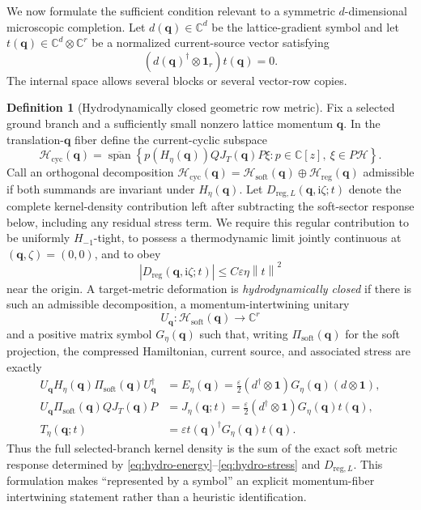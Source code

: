 \documentclass[11pt]{article}
\theoremstyle{definition}
\newtheorem{definition}[theorem]{Definition}
\theoremstyle{remark}
\newcommand{\cH}{\mathcal H}
\newcommand{\Id}{\mathbf 1}
\newcommand{\Span}{\operatorname{span}}
\newcommand{\I}{\mathrm i}
\newcommand{\norm}[1]{\left\lVert #1\right\rVert}
\newcommand{\abs}[1]{\left\lvert #1\right\rvert}
\newcommand{\eps}{\varepsilon}
\newcommand{\bq}{\bm q}
\begin{document}
We now formulate the sufficient condition relevant to a symmetric
$d$-dimensional microscopic completion.  Let $d(\bq)\in\mathbb C^d$ be the
lattice-gradient symbol and let $t(\bq)\in\mathbb C^d\otimes\mathbb C^r$ be a
normalized current-source vector satisfying
\begin{equation}
 (d(\bq)^\dagger\otimes\Id_r)t(\bq)=0.
 \label{eq:transverse-symbol}
\end{equation}
The internal space allows several blocks or several vector-row copies.

\begin{definition}[Hydrodynamically closed geometric row metric]
\label{def:hydro-closed}
Fix a selected ground branch and a sufficiently small nonzero lattice momentum
$\bq$.  In the translation-$\bq$ fiber define the current-cyclic subspace
\begin{equation}
 \cH_{\mathrm{cyc}}(\bq)
 =\overline{\Span}\left\{
 p(H_\eta(\bq))QJ_T(\bq)P\xi:
 p\in\mathbb C[z],\ \xi\in P\cH
 \right\}.
 \label{eq:current-cyclic}
\end{equation}
Call an orthogonal decomposition
$\cH_{\mathrm{cyc}}(\bq)=\cH_{\mathrm{soft}}(\bq)\oplus
\cH_{\mathrm{reg}}(\bq)$ admissible if both summands are invariant under
$H_\eta(\bq)$.  Let $D_{\mathrm{reg},L}(\bq,\I\zeta;t)$ denote the complete
kernel-density contribution left after subtracting the soft-sector response
below, including any residual stress term.  We require this regular contribution
to be uniformly $H_{-1}$-tight, to possess a thermodynamic limit jointly
continuous at $(\bq,\zeta)=(0,0)$, and to obey
\begin{equation}
 \abs{D_{\mathrm{reg}}(\bq,\I\zeta;t)}
 \le C\eps\eta\norm{t}^2
 \label{eq:regular-bound}
\end{equation}
near the origin.  A target-metric deformation is \emph{hydrodynamically
closed} if there is such an admissible decomposition, a momentum-intertwining
unitary
\begin{equation}
 U_{\bq}:\cH_{\mathrm{soft}}(\bq)\longrightarrow\mathbb C^r
 \label{eq:closure-intertwiner}
\end{equation}
and a positive matrix symbol $G_\eta(\bq)$ such that, writing
$\Pi_{\mathrm{soft}}(\bq)$ for the soft projection, the compressed Hamiltonian,
current source, and associated stress are exactly
\begin{align}
 U_{\bq}H_\eta(\bq)\Pi_{\mathrm{soft}}(\bq)U_{\bq}^\dagger
 &=E_\eta(\bq)
 =\frac{\eps}{2}(d^\dagger\otimes\Id)
 G_\eta(\bq)(d\otimes\Id),
 \label{eq:hydro-energy}\\
 U_{\bq}\Pi_{\mathrm{soft}}(\bq)QJ_T(\bq)P
 &=J_\eta(\bq;t)
 =\frac{\eps}{2}(d^\dagger\otimes\Id)G_\eta(\bq)t(\bq),
 \label{eq:hydro-current}\\
 T_\eta(\bq;t)
 &=\eps t(\bq)^\dagger G_\eta(\bq)t(\bq).
 \label{eq:hydro-stress}
\end{align}
Thus the full selected-branch kernel density is the sum of the exact soft
metric response determined by \eqref{eq:hydro-energy}--\eqref{eq:hydro-stress}
and $D_{\mathrm{reg},L}$.  This formulation makes ``represented by a symbol''
an explicit momentum-fiber intertwining statement rather than a heuristic
identification.
\end{definition}
\end{document}
